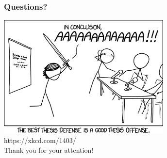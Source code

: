 \documentclass{beamer}
\begin{document}
    \begin{frame}
        \frametitle{Questions?}
        \centering
        \includegraphics[width=0.65\textwidth]{images/xkcd.png}\\
        \tiny https://xkcd.com/1403/\\
        \Huge Thank you for your attention!
    \end{frame}
    
\end{document}
